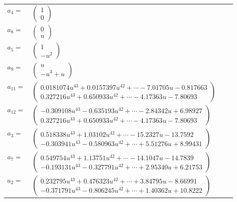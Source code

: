 \documentclass[1p]{elsarticle_modified}
\theoremstyle{definition}
\begin{document}
\begin{tabular}{m{7pt} m{180pt} m{7pt} m{180pt} }
\flushright $a_{4}=$&$\begin{pmatrix}1\\0\end{pmatrix}$ \\
\flushright $a_{8}=$&$\begin{pmatrix}0\\u\end{pmatrix}$ \\
\flushright $a_{5}=$&$\begin{pmatrix}1\\- u^2\end{pmatrix}$ \\
\flushright $a_{9}=$&$\begin{pmatrix}u\\- u^3+u\end{pmatrix}$ \\
\flushright $a_{11}=$&$\begin{pmatrix}0.0181074 u^{43}+0.0157397 u^{42}+\cdots-7.01705 u-0.817663\\0.327216 u^{43}+0.650933 u^{42}+\cdots-4.17363 u-7.80693\end{pmatrix}$ \\
\flushright $a_{12}=$&$\begin{pmatrix}-0.309108 u^{43}-0.635193 u^{42}+\cdots-2.84342 u+6.98927\\0.327216 u^{43}+0.650933 u^{42}+\cdots-4.17363 u-7.80693\end{pmatrix}$ \\
\flushright $a_{3}=$&$\begin{pmatrix}0.518338 u^{43}+1.03102 u^{42}+\cdots-15.2327 u-13.7592\\-0.303941 u^{43}-0.580963 u^{42}+\cdots+5.51276 u+8.99431\end{pmatrix}$ \\
\flushright $a_{7}=$&$\begin{pmatrix}0.549754 u^{43}+1.13751 u^{42}+\cdots-14.1047 u-14.7839\\-0.193131 u^{43}-0.327791 u^{42}+\cdots+2.95340 u+6.21753\end{pmatrix}$ \\
\flushright $a_{2}=$&$\begin{pmatrix}0.232795 u^{43}+0.476323 u^{42}+\cdots+3.84795 u-8.66991\\-0.371791 u^{43}-0.806245 u^{42}+\cdots+1.40362 u+10.8222\end{pmatrix}$ \\

\end{tabular}
\end{document}
